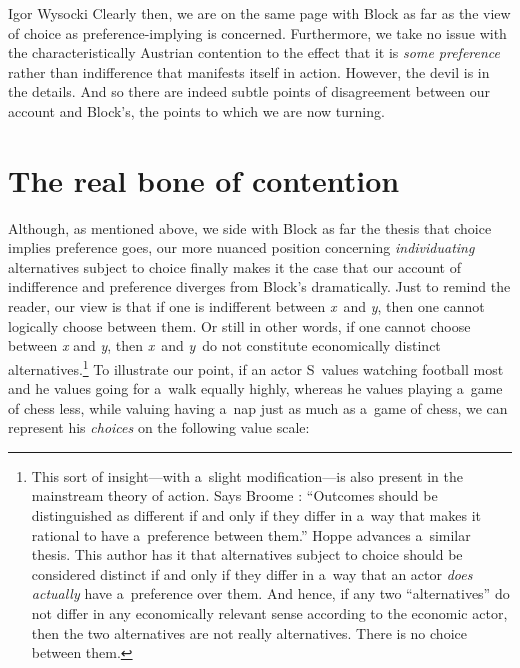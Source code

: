 \begin{artengenv}{Igor Wysocki}
Clearly then, we are on the same page with Block as far as the view of choice as preference-implying is concerned. Furthermore, we take no issue with the characteristically Austrian contention to the effect that it is \textit{some preference} rather than indifference that manifests itself in action. However, the devil is in the details. And so there are indeed subtle points of disagreement between our account and Block's, the points to which we are now turning.



\section{The real bone of contention}

Although, as mentioned above, we side with Block as far the thesis that choice implies preference goes, our more nuanced position concerning \textit{individuating} alternatives subject to choice finally makes it the case that our account of indifference and preference diverges from Block's dramatically. Just to remind the reader, our view is that if one is indifferent between \textit{x}~and \textit{y}, then one cannot logically choose between them. Or still in other words, if one cannot choose between \textit{x} and \textit{y}, then \textit{x}~and \textit{y}~do not constitute economically distinct alternatives.\footnote{This sort of insight---with a~slight modification---is also present in the mainstream theory of action. Says Broome 
\parencite*[][p.103]{broome_weighing_1991}: %
 ``Outcomes should be distinguished as different if and only if they differ in a~way that makes it rational to have a~preference between them.'' Hoppe 
\parencite*[][]{hoppe_must_2005} %
 advances a~similar thesis. This author has it that alternatives subject to choice should be considered distinct if and only if they differ in a~way that an actor \textit{does actually} have a~preference over them. And hence, if any two ``alternatives'' do not differ in any economically relevant sense according to the economic actor, then the two alternatives are not really alternatives. There is no choice between them. } To illustrate our point, if an actor S~values watching football most and he values going for a~walk equally highly, whereas he values playing a~game of chess less, while valuing having a~nap just as much as a~game of chess, we can represent his \textit{choices} on the following value scale:








\end{artengenv}
